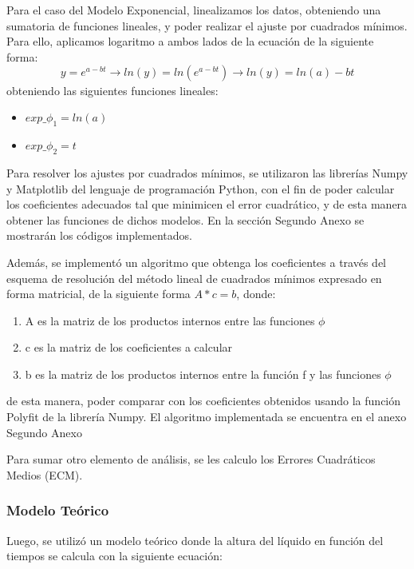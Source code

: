 \documentclass{article}
\begin{document}
Para el caso del Modelo Exponencial, linealizamos los datos, obteniendo una sumatoria de funciones lineales, y poder realizar el ajuste por cuadrados mínimos. Para ello, aplicamos logaritmo a ambos lados de la ecuación de la siguiente forma:
\begin{equation}
    y = e^{a-bt} \xrightarrow[]{} ln(y) = ln(e^{a-bt}) \xrightarrow[]{} ln(y) = ln(a) - bt
\end{equation}
obteniendo las siguientes funciones lineales:
\begin{center}
    \begin{minipage}{0.8\textwidth}
        \begin{itemize}
            \item $exp\_\phi_1 = ln(a)$
            \item $exp\_\phi_2 = t$
        \end{itemize}
    \end{minipage}
\end{center}

Para resolver los ajustes por cuadrados mínimos, se utilizaron las librerías Numpy y Matplotlib del lenguaje de programación Python, con el fin de poder calcular los coeficientes adecuados tal que minimicen el error cuadrático, y de esta manera obtener las funciones de dichos modelos. En la sección Segundo Anexo se mostrarán los códigos implementados. 

Además, se implementó un algoritmo que obtenga los coeficientes a través del esquema de resolución del método lineal de cuadrados mínimos expresado en forma matricial, de la siguiente forma $A*c = b$, donde:

\begin{enumerate}
    \item A es la matriz de los productos internos entre las funciones $\phi$
    \item c es la matriz de los coeficientes a calcular
    \item b es la matriz de los productos internos entre la función f y las funciones $\phi$
\end{enumerate}
de esta manera, poder comparar con los coeficientes obtenidos usando la función Polyfit de la librería Numpy. El algoritmo implementada se encuentra en el anexo Segundo Anexo

Para sumar otro elemento de análisis, se les calculo los Errores Cuadráticos Medios (ECM).

\subsubsection{Modelo Teórico}
Luego, se utilizó un modelo teórico donde la altura del líquido en función del tiempos se calcula con la siguiente ecuación:
\end{document}
